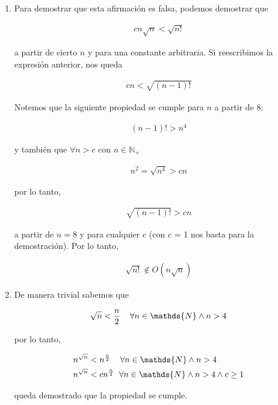\begin{enumerate}
    \item Para demostrar que esta afirmación es falsa, podemos demostrar que
    
    \begin{align}
        cn\sqrt{n} < \sqrt{n!}
    \end{align}
    
    a partir de cierto $n$ y para una constante arbitraria. Si reescribimos la expresión anterior, nos queda 
    
    \begin{align}
        cn < \sqrt{(n-1)!}
    \end{align}
    
    Notemos que la siguiente propiedad se cumple para $n$ a partir de $8$:
    
    \begin{align}
        (n-1)! > n^4
    \end{align}
    
    y también que $\forall n > c$ con $n \in \mathds{N}_+$
    
    \begin{align}
        n^2 = \sqrt{n^4} > cn 
    \end{align}
    
    por lo tanto, 
    
    \begin{align}
        \sqrt{(n-1)!} > cn
    \end{align}
    
    a partir de $n = 8$ y para cualquier c (con c = 1 nos basta para la demostración). Por lo tanto, 
    
    \begin{align}
        \sqrt{n!} \notin O(n\sqrt{n})
    \end{align}
    
    \item De manera trivial sabemos que 
    
    \begin{align}
        \sqrt{n} < \frac{n}{2} \hspace{4mm} \forall n \in \mathds{N} \land n > 4
    \end{align}
    
    por lo tanto,
    
    \begin{align}
        n^{\sqrt{n}} &< n^{\frac{n}{2}} \hspace{4mm} \forall n \in \mathds{N} \land n > 4 \\
        n^{\sqrt{n}} &< cn^{\frac{n}{2}} \hspace{2mm} \forall n \in \mathds{N} \land n > 4 \land c \geq 1
    \end{align}
    
    queda demostrado que la propiedad se cumple.
\end{enumerate}